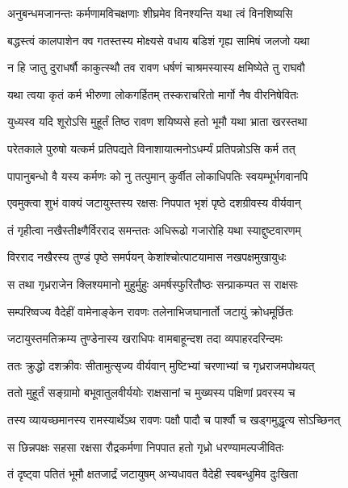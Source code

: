 \twolineshloka
{अनुबन्धमजानन्तः कर्मणामविचक्षणाः}
{शीघ्रमेव विनश्यन्ति यथा त्वं विनशिष्यसि} %

\twolineshloka
{बद्धस्त्वं कालपाशेन क्व गतस्तस्य मोक्ष्यसे}
{वधाय बडिशं गृह्य सामिषं जलजो यथा} %

\twolineshloka
{न हि जातु दुराधर्षौ काकुत्स्थौ तव रावण}
{धर्षणं चाश्रमस्यास्य क्षमिष्येते तु राघवौ} %

\twolineshloka
{यथा त्वया कृतं कर्म भीरुणा लोकगर्हितम्}
{तस्कराचरितो मार्गो नैष वीरनिषेवितः} %

\twolineshloka
{युध्यस्व यदि शूरोऽसि मुहूर्तं तिष्ठ रावण}
{शयिष्यसे हतो भूमौ यथा भ्राता खरस्तथा} %

\twolineshloka
{परेतकाले पुरुषो यत्कर्म प्रतिपद्यते}
{विनाशायात्मनोऽधर्म्यं प्रतिपन्नोऽसि कर्म तत्} %

\twolineshloka
{पापानुबन्धो वै यस्य कर्मणः को नु तत्पुमान्}
{कुर्वीत लोकाधिपतिः स्वयम्भूर्भगवानपि} %

\twolineshloka
{एवमुक्त्वा शुभं वाक्यं जटायुस्तस्य रक्षसः}
{निपपात भृशं पृष्ठे दशग्रीवस्य वीर्यवान्} %

\twolineshloka
{तं गृहीत्वा नखैस्तीक्ष्णैर्विरराद समन्ततः}
{अधिरूढो गजारोहि यथा स्याद्दुष्टवारणम्} %

\twolineshloka
{विरराद नखैरस्य तुण्डं पृष्ठे समर्पयन्}
{केशांश्चोत्पाटयामास नखपक्षमुखायुधः} %

\twolineshloka
{स तथा गृध्रराजेन क्लिश्यमानो मुहुर्मुहुः}
{अमर्षस्फुरितौष्ठः सन्प्राकम्पत स राक्षसः} %

\twolineshloka
{सम्परिष्वज्य वैदेहीं वामेनाङ्केन रावणः}
{तलेनाभिजघानार्तो जटायुं क्रोधमूर्छितः} %

\twolineshloka
{जटायुस्तमतिक्रम्य तुण्डेनास्य खराधिपः}
{वामबाहून्दश तदा व्यपाहरदरिन्दमः} %

\twolineshloka
{ततः क्रुद्धो दशक्रीवः सीतामुत्सृज्य वीर्यवान्}
{मुष्टिभ्यां चरणाभ्यां च गृध्रराजमपोथयत्} %

\twolineshloka
{ततो मुहूर्तं सङ्ग्रामो बभूवातुलवीर्ययोः}
{राक्षसानां च मुख्यस्य पक्षिणां प्रवरस्य च} %

\twolineshloka
{तस्य व्यायच्छमानस्य रामस्यार्थेऽथ रावणः}
{पक्षौ पादौ च पार्श्वौ च खड्गमुद्धृत्य सोऽच्छिनत्} %

\twolineshloka
{स छिन्नपक्षः सहसा रक्षसा रौद्रकर्मणा}
{निपपात हतो गृध्रो धरण्यामल्पजीवितः} %

\twolineshloka
{तं दृष्ट्वा पतितं भूमौ क्षतजार्द्रं जटायुषम्}
{अभ्यधावत वैदेही स्वबन्धुमिव दुःखिता} %

